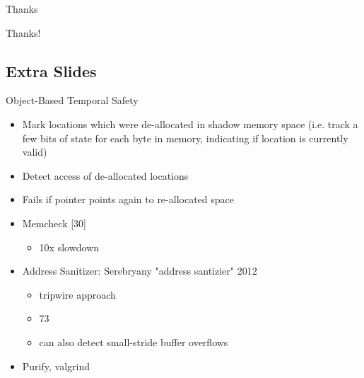 \documentclass[aspectratio=169]{beamer}
\begin{document}
\begin{frame}{Thanks}
    \begin{center}
        \Huge{Thanks!}
    \end{center}
\end{frame}

\subsection{Extra Slides}


\begin{frame}{Object-Based Temporal Safety}
\begin{itemize}
\item Mark locations which were de-allocated in shadow memory space (i.e. track a few bits of state for each byte in memory, indicating if location is currently valid)
\item Detect access of de-allocated locations
\item Fails if pointer points again to re-allocated space
\item Memcheck [30] 
    \begin{itemize}
      \item 10x slowdown
    \end{itemize}
\item Address Sanitizer: Serebryany "address santizier" 2012
    \begin{itemize}
        \item tripwire approach
        \item 73%
        \item can also detect small-stride buffer overflows
    \end{itemize}
\item Purify, valgrind
\end{itemize}
\end{frame}
\end{document}
